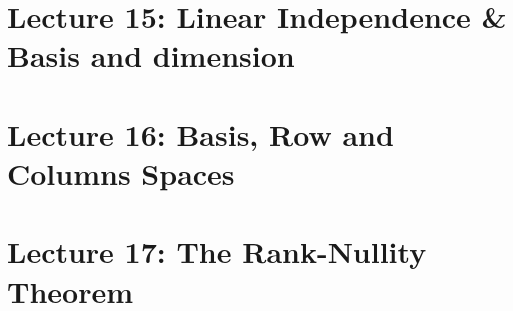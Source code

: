 \documentclass[oneside]{book}
\begin{document}
\newpage
\section{Lecture 15: Linear Independence \& Basis and dimension}

\section{Lecture 16: Basis, Row and Columns Spaces}


\section{Lecture 17: The Rank-Nullity Theorem}

\end{document}
